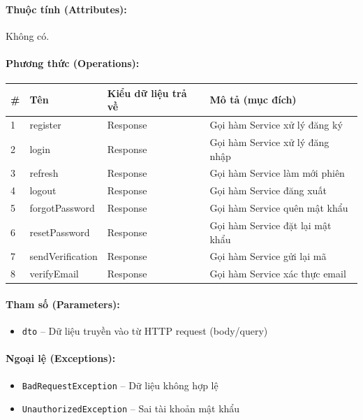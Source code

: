 \documentclass[12pt,a4paper]{article}
\begin{document}
\paragraph{Thuộc tính (Attributes):}
Không có.

\paragraph{Phương thức (Operations):}
\begin{longtable}{|p{0.6cm}|p{5.0cm}|p{2.8cm}|p{5.4cm}|}
\hline
\textbf{\#} & \textbf{Tên} & \textbf{Kiểu dữ liệu trả về} & \textbf{Mô tả (mục đích)} \\ \hline
\endhead
1 & register & Response & Gọi hàm Service xử lý đăng ký \\ \hline
2 & login & Response & Gọi hàm Service xử lý đăng nhập \\ \hline
3 & refresh & Response & Gọi hàm Service làm mới phiên \\ \hline
4 & logout & Response & Gọi hàm Service đăng xuất \\ \hline
5 & forgotPassword & Response & Gọi hàm Service quên mật khẩu \\ \hline
6 & resetPassword & Response & Gọi hàm Service đặt lại mật khẩu \\ \hline
7 & sendVerification & Response & Gọi hàm Service gửi lại mã \\ \hline
8 & verifyEmail & Response & Gọi hàm Service xác thực email \\ \hline
\end{longtable}

\paragraph{Tham số (Parameters):}
\begin{itemize}[leftmargin=*]
    \item \texttt{dto} – Dữ liệu truyền vào từ HTTP request (body/query)
\end{itemize}


\paragraph{Ngoại lệ (Exceptions):}
\begin{itemize}[leftmargin=*]
    \item \texttt{BadRequestException} – Dữ liệu không hợp lệ
    \item \texttt{UnauthorizedException} – Sai tài khoản mật khẩu
\end{itemize}
\end{document}
